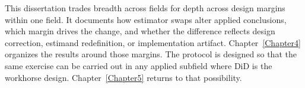 This dissertation trades breadth across fields for depth across design margins within one field. It documents how estimator swaps alter applied conclusions, which margin drives the change, and whether the difference reflects design correction, estimand redefinition, or implementation artifact. Chapter~\ref{Chapter4} organizes the results around those margins. The protocol is designed so that the same exercise can be carried out in any applied subfield where DiD is the workhorse design. Chapter~\ref{Chapter5} returns to that possibility.